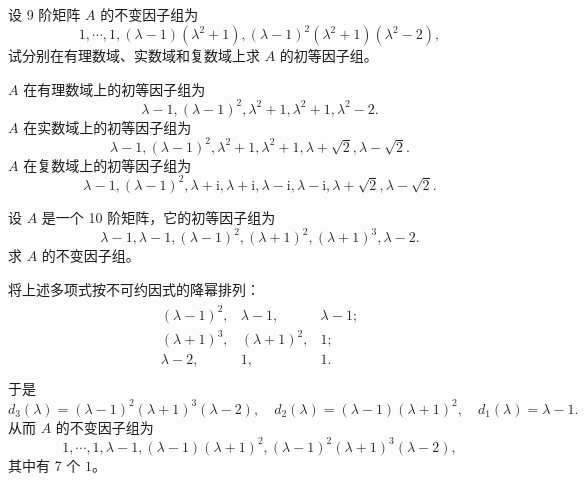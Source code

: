 \documentclass[../../main.tex]{subfiles}%
\begin{document}
\begin{example}
设 9 阶矩阵 $A$ 的不变因子组为
\[
1,\cdots,1,(\lambda - 1)(\lambda^2 + 1),(\lambda - 1)^2(\lambda^2 + 1)(\lambda^2 - 2),
\]
试分别在有理数域、实数域和复数域上求 $A$ 的初等因子组。
\end{example}
\begin{solution}
$A$ 在有理数域上的初等因子组为
\[
\lambda - 1,(\lambda - 1)^2,\lambda^2 + 1,\lambda^2 + 1,\lambda^2 - 2.
\]
$A$ 在实数域上的初等因子组为
\[
\lambda - 1,(\lambda - 1)^2,\lambda^2 + 1,\lambda^2 + 1,\lambda + \sqrt{2},\lambda - \sqrt{2}.
\]
$A$ 在复数域上的初等因子组为
\[
\lambda - 1,(\lambda - 1)^2,\lambda + \mathrm{i},\lambda + \mathrm{i},\lambda - \mathrm{i},\lambda - \mathrm{i},\lambda + \sqrt{2},\lambda - \sqrt{2}.
\]

\end{solution}

\begin{example}
设 $A$ 是一个 10 阶矩阵，它的初等因子组为
\[
\lambda - 1,\lambda - 1,(\lambda - 1)^2,(\lambda + 1)^2,(\lambda + 1)^3,\lambda - 2.
\]
求 $A$ 的不变因子组。
\end{example}
\begin{solution}
将上述多项式按不可约因式的降幂排列：
\begin{align*}
\begin{matrix}
(\lambda -1)^2,&		\lambda -1,&		\lambda -1;\\
(\lambda +1)^3,&		(\lambda +1)^2,&		1;\\
\lambda -2,&		1,&		1.\\
\end{matrix}
\end{align*}
于是
\[
d_3(\lambda)=(\lambda - 1)^2(\lambda + 1)^3(\lambda - 2),\quad d_2(\lambda)=(\lambda - 1)(\lambda + 1)^2,\quad d_1(\lambda)=\lambda - 1.
\]
从而 $A$ 的不变因子组为
\[
1,\cdots,1,\lambda - 1,(\lambda - 1)(\lambda + 1)^2,(\lambda - 1)^2(\lambda + 1)^3(\lambda - 2),
\]
其中有 7 个 $1$。 

\end{solution}
\end{document}
